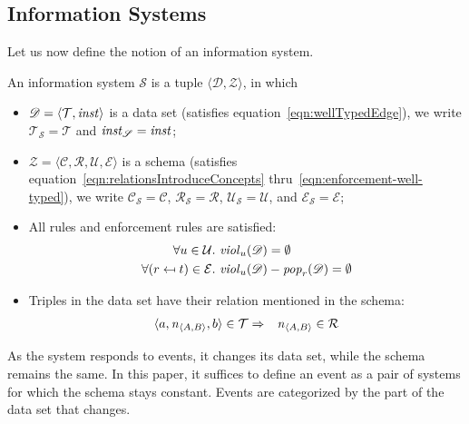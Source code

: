 \documentclass[runningheads]{llncs}
\newcommand{\id}[1]{\text{\it #1\/}}
\newcommand{\popF}[1]{\id{pop}_{#1}}
\newcommand{\pop}[2]{\popF{#1}(#2)}
\newcommand{\instance}{\mathbin{\id{inst}}}
\newcommand{\viol}[2]{\violC{#1}(#2)}
\newcommand{\violC}[1]{\id{viol}_{#1}}
\newcommand{\declare}[3]{\id{#1}_{\pair{#2}{#3}}}
\newcommand{\pair}[2]{\langle{#1},{#2}\rangle}
\newcommand{\triple}[3]{\langle{#1},{#2},{#3}\rangle}
\newcommand{\quadruple}[4]{\langle{#1},{#2},{#3},{#4}\rangle}
\newcommand{\concepts}{\mathcal{C}}
\newcommand{\rels}{\mathcal{R}}   %
\newcommand{\triples}{\mathcal{T}}
\newcommand{\enforces}{\mathcal{E}}
\newcommand{\rules}{\mathcal{U}}
\newcommand{\dataset}{\mathscr{D}}
\newcommand{\schema}{\mathscr{Z}}
\newcommand{\infsys}{\mathscr{S}}
\def\define#1{\label{dfn:#1}{\em #1}\index{#1}}
\begin{document}
\subsection{Information Systems}
\label{sct:Information Systems}
   Let us now define the notion of an information system.
\begin{definition}
\label{def:information system}
\item An information system $\infsys$ is a tuple $\pair{\dataset}{\schema}$, in which
\begin{itemize}
   \item $\dataset=\pair{\triples}{\instance}$ is a data set (satisfies equation~\ref{eqn:wellTypedEdge}), we write $\triples_\infsys = \triples$ and $\instance_\infsys = \instance$;
   \item $\schema=\quadruple{\concepts}{\rels}{\rules}{\enforces}$ is a schema (satisfies equation~\ref{eqn:relationsIntroduceConcepts} thru~\ref{eqn:enforcement-well-typed}), we write $\concepts_\infsys = \concepts$, $\rels_\infsys = \rels$, $\rules_\infsys=\rules$, and $\enforces_\infsys=\enforces$;
   \item All rules and enforcement rules are satisfied:
   \begin{align}
   \forall u\in\rules&.~\viol{u}{\dataset}=\emptyset\\
   \forall (r\mapsfrom t)\in\enforces&.~\viol{u}{\dataset} - \pop{r}{\dataset}=\emptyset
   \label{eqn:satisfaction}
   \end{align}
   \item Triples in the data set have their relation mentioned in the schema:
   \begin{eqnarray}
   \triple{a}{\declare{n}{A}{B}}{b}\in\triples&\Rightarrow&\declare{n}{A}{B}\in\rels
   \label{eqn:define R}
   \end{eqnarray}
\end{itemize}
\end{definition}

   As the system responds to events, it changes its data set, while the schema remains the same.
   In this paper, it suffices to define an event as a pair of systems for which the schema stays constant.
   Events are categorized by the part of the data set that changes.
   
\end{document}
